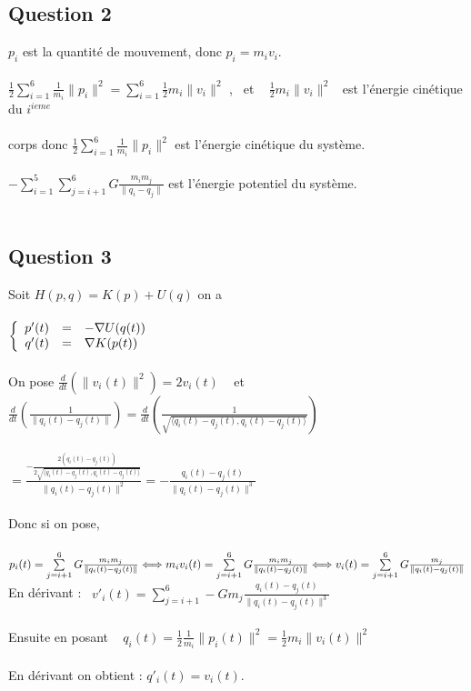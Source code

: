 \documentclass{article}
\begin{document}
\subsection*{Question 2}
$p_i$ est la quantité de mouvement, donc $p_i=m_iv_i$.\\ \\
$\frac{1}{2} \sum\limits_{i=1}^6 \frac{1}{m_i}\|p_i\|^2= \sum\limits_{i=1}^6\frac{1}{2}m_i\|v_i\|^2 $       ,~ et ~ $\frac{1}{2}m_i\|v_i\|^2$~ est l'énergie cinétique du $i^{ieme}$\\ \\ corps donc $\frac{1}{2} \sum\limits_{i=1}^6 \frac{1}{m_i}\|p_i\|^2$ est l'énergie cinétique du système.\\ \\
$-\sum\limits_{i=1}^5\sum\limits_{j=i+1}^6G\frac{m_im_j}{\|q_i-q_j\|}$ est l'énergie potentiel du système. \\ \\
\subsection*{Question 3}
Soit $H(p,q)=K(p)+U(q)$ on a \\ \\ $\left \{
   \begin{array}{r c l}
      p'(t)  & = & -\nabla U(q(t)) \\
      q'(t)  & = & \nabla K(p(t)) \\
   \end{array}
   \right. $
   \\ \\
   On pose $\frac{d}{dt}(\|v_i(t)\|^2)=2v_i(t)$ ~ et ~ $\frac{d}{dt}(\frac{1}{\|q_i(t)-q_j(t)\|})=\frac{d}{dt}(\frac{1}{\sqrt{\langle q_i(t)-q_j(t),q_i(t)-q_j(t)\rangle}})$\\ \\
   $=\frac{-\frac{2(q_i(t)-q_j(t))}{2\sqrt{\langle q_i(t)-q_j(t),q_i(t)-q_j(t)\rangle}}}{\|q_i(t)-q_j(t)\|^2} =- \frac{q_i(t)-q_j(t)}{\|q_i(t)-q_j(t)\|^3}$\\ \\
   Donc si on pose, \\ \\ $p_i(t)=\sum\limits_{j=i+1}^6G\frac{m_im_j}{\|q_i(t)-q_j(t)\|} \Longleftrightarrow m_iv_i(t)=\sum\limits_{j=i+1}^6G\frac{m_im_j}{\|q_i(t)-q_j(t)\|} \\\Longleftrightarrow v_i(t)=\sum\limits_{j=i+1}^6G\frac{m_j}{\|q_i(t)-q_j(t)\|} $ \\ En dérivant :  ~$v'_i(t)=\sum\limits_{j=i+1}^6 -Gm_j\frac{q_i(t)-q_j(t)}{\|q_i(t)-q_j(t)\|^3}$ \\ \\
   Ensuite en posant ~ $q_i(t)=\frac{1}{2}\frac{1}{m_i}\|p_i(t)\|^2=\frac{1}{2}m_i\|v_i(t)\|^2$~ \\ \\
   En dérivant on obtient : $q'_i(t)=v_i(t)$. \\ \\
\end{document}

